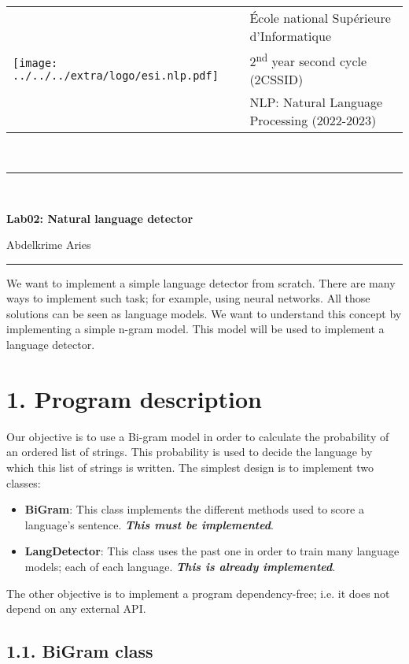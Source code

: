\documentclass[11pt, a4paper]{article}
\begin{document}

\noindent
\begin{tabular}{ll}
\multirow{3}{*}{\texttt{[image: ../../../extra/logo/esi.nlp.pdf]}} & \'Ecole national Supérieure d'Informatique\\
& 2\textsuperscript{nd} year second cycle (2CSSID)\\
& NLP: Natural Language Processing (2022-2023)
\end{tabular}\\[.25cm]
\noindent\rule{\textwidth}{2pt}\\[-0.5cm]
\begin{center}
{\LARGE \textbf{Lab02: Natural language detector}}
\begin{flushright}
	Abdelkrime Aries
\end{flushright}
\end{center}\vspace{-0.5cm}
\noindent\rule{\textwidth}{2pt}

We want to implement a simple language detector from scratch. 
There are many ways to implement such task; for example, using neural networks.
All those solutions can be seen as language models.
We want to understand this concept by implementing a simple n-gram model.
This model will be used to implement a language detector.

\section*{1. Program description}

Our objective is to use a Bi-gram model in order to calculate the probability of an ordered list of strings.
This probability is used to decide the language by which this list of strings is written.
The simplest design is to implement two classes:
\begin{itemize}
	\item \textbf{BiGram}: This class implements the different methods used to score a language's sentence.
	\textbf{\slshape This must be implemented}.
	\item \textbf{LangDetector}: This class uses the past one in order to train many language models; each of each language.
	\textbf{\slshape This is already implemented}.
\end{itemize}
The other objective is to implement a program dependency-free; i.e. it does not depend on any external API.


\subsection*{1.1. BiGram class}
\end{document}
